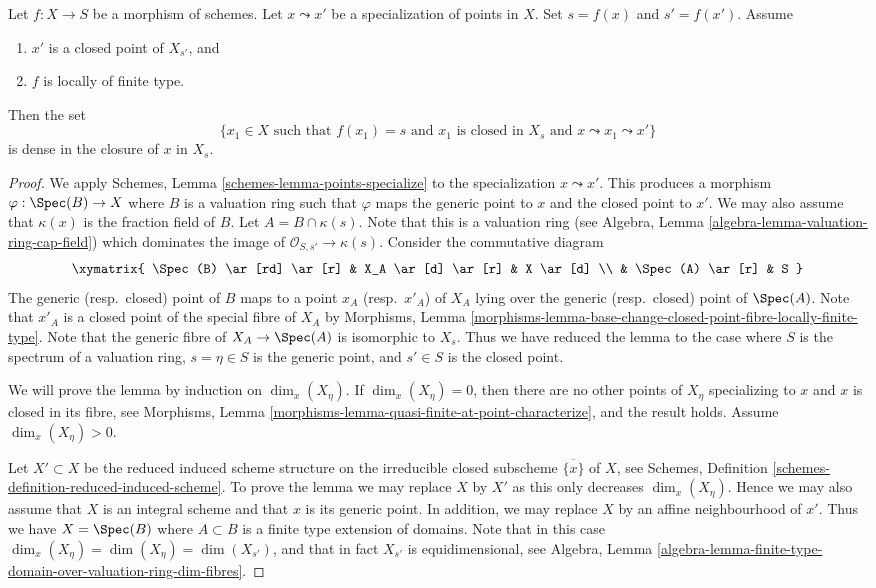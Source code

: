 \begin{lemma}
\label{lemma-closed-point-nearby-fibre}
Let $f : X \to S$ be a morphism of schemes.
Let $x \leadsto x'$ be a specialization of points in $X$.
Set $s = f(x)$ and $s' = f(x')$.
Assume
\begin{enumerate}
\item $x'$ is a closed point of $X_{s'}$, and
\item $f$ is locally of finite type.
\end{enumerate}
Then the set
$$
\{x_1 \in X
\text{ such that }
f(x_1) = s
\text{ and }
x_1\text{ is closed in }X_s
\text{ and }
x \leadsto x_1 \leadsto x'
\}
$$
is dense in the closure of $x$ in $X_s$.
\end{lemma}

\begin{proof}
We apply
Schemes, Lemma \ref{schemes-lemma-points-specialize}
to the specialization $x \leadsto x'$.
This produces a morphism $\varphi : \Spec(B) \to X$
where $B$ is a valuation ring such that $\varphi$ maps the
generic point to $x$ and the closed point to $x'$. We may also
assume that $\kappa(x)$ is the fraction field of $B$.
Let $A = B \cap \kappa(s)$. Note that this is a valuation ring (see
Algebra, Lemma \ref{algebra-lemma-valuation-ring-cap-field})
which dominates the image of $\mathcal{O}_{S, s'} \to \kappa(s)$.
Consider the commutative diagram
$$
\xymatrix{
\Spec(B) \ar[rd] \ar[r] &
X_A \ar[d] \ar[r] & X \ar[d] \\
& \Spec(A) \ar[r] & S
}
$$
The generic (resp.\ closed) point of $B$ maps to a point $x_A$
(resp.\ $x'_A$) of $X_A$ lying over the generic (resp.\ closed)
point of $\Spec(A)$. Note that $x'_A$ is a closed point
of the special fibre of $X_A$ by
Morphisms,
Lemma \ref{morphisms-lemma-base-change-closed-point-fibre-locally-finite-type}.
Note that the generic fibre of $X_A \to \Spec(A)$ is isomorphic
to $X_s$. Thus we have reduced the lemma to the case where $S$ is
the spectrum of a valuation ring, $s = \eta \in S$ is the generic point, and
$s' \in S$ is the closed point.

\medskip\noindent
We will prove the lemma by induction on $\dim_x(X_\eta)$.
If $\dim_x(X_\eta) = 0$, then there are no other points of $X_\eta$
specializing to $x$ and $x$ is closed in its fibre, see
Morphisms, Lemma \ref{morphisms-lemma-quasi-finite-at-point-characterize},
and the result holds. Assume $\dim_x(X_\eta) > 0$.

\medskip\noindent
Let $X' \subset X$ be the reduced induced scheme structure on
the irreducible closed subscheme $\overline{\{x\}}$ of $X$, see
Schemes, Definition \ref{schemes-definition-reduced-induced-scheme}.
To prove the lemma we may replace $X$ by $X'$ as this only decreases
$\dim_x(X_\eta)$. Hence we may also assume that $X$ is an integral scheme
and that $x$ is its generic point. In addition, we may replace $X$ by an
affine neighbourhood of $x'$. Thus we have $X = \Spec(B)$ where
$A \subset B$ is a finite type extension of domains. Note that in
this case $\dim_x(X_\eta) = \dim(X_\eta) = \dim(X_{s'})$, and that in fact
$X_{s'}$ is equidimensional, see
Algebra,
Lemma \ref{algebra-lemma-finite-type-domain-over-valuation-ring-dim-fibres}.


\end{proof}

